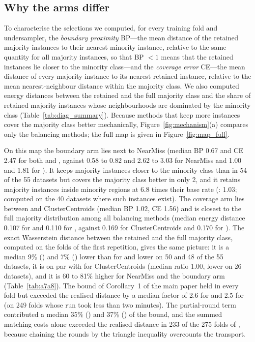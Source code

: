 


\subsection{Why the arms differ}\label{sec:results:mechanisms}

To characterise the selections we computed, for every training fold and undersampler, the \emph{boundary proximity} BP---the mean distance of the retained majority instances to their nearest minority instance, relative to the same quantity for all majority instances, so that BP $<1$ means that the retained instances lie closer to the minority class---and the \emph{coverage error} CE---the mean distance of every majority instance to its nearest retained instance, relative to the mean nearest-neighbour distance within the majority class. We also computed energy distances between the retained and the full majority class and the share of retained majority instances whose neighbourhoods are dominated by the minority class (Table~\ref{tab:diag_summary}). Because methods that keep more instances cover the majority class better mechanically, Figure~\ref{fig:mechanism}(a) compares only the balancing methods; the full map is given in Figure~\ref{fig:map_full}.

On this map the boundary arm lies next to NearMiss (median BP 0.67 and CE 2.47 for both \MUSBS{} and \MUSBO, against 0.58 to 0.82 and 2.62 to 3.03 for NearMiss and 1.00 and 1.81 for \RUS). It keeps majority instances closer to the minority class than \RUS{} in 54 of the 55 datasets but covers the majority class better in only 2, and it retains majority instances inside minority regions at 6.8 times their base rate (\RUS: 1.03; computed on the 40 datasets where such instances exist). The coverage arm lies between \RUS{} and ClusterCentroids (median BP 1.02, CE 1.56) and is closest to the full majority distribution among all balancing methods (median energy distance 0.107 for \MUSCS{} and 0.110 for \MUSCO, against 0.169 for ClusterCentroids and 0.170 for \RUS). The exact Wasserstein distance between the retained and the full majority class, computed on the folds of the first repetition, gives the same picture: it is a median 9\% (\MUSCS) and 7\% (\MUSCO) lower than for \RUS{} and lower on 50 and 48 of the 55 datasets, it is on par with \RUS{} for ClusterCentroids (median ratio 1.00, lower on 26 datasets), and it is 60 to 81\% higher for NearMiss and the boundary arm (Table~\ref{tab:a7a8}). The bound of Corollary~1 of the main paper held in every fold but exceeded the realised distance by a median factor of 2.6 for \MUSCS{} and 2.5 for \MUSCO{} (on 249 folds whose \MUSCO{} run took less than two minutes). The partial-round term contributed a median 35\% (\MUSCS) and 37\% (\MUSCO) of the bound, and the summed matching costs alone exceeded the realised distance in 233 of the 275 folds of \MUSCS, because chaining the rounds by the triangle inequality overcounts the transport.

